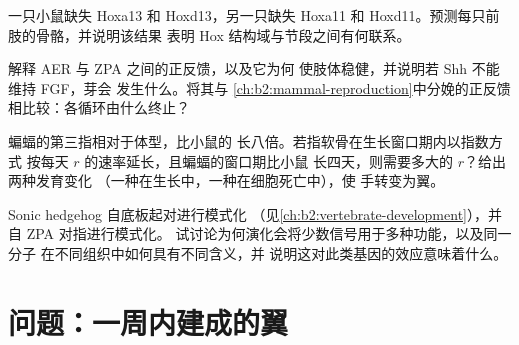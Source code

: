 \begin{exercise}[$\star\star$]\label{exo:b2:limb-organogenesis:9}
一只小鼠缺失 Hoxa13 和 Hoxd13，另一只缺失 Hoxa11 和
Hoxd11。预测每只前肢的骨骼，并说明该结果
表明 Hox 结构域与节段之间有何联系。
\end{exercise}

\begin{exercise}[$\star\star\star$]\label{exo:b2:limb-organogenesis:10}
解释 AER 与 ZPA 之间的正反馈，以及它为何
使肢体稳健，并说明若 Shh 不能维持 FGF，芽会
发生什么。将其与
\cref{ch:b2:mammal-reproduction}中分娩的正反馈相比较：各循环由什么终止？
\end{exercise}

\begin{exercise}[$\star\star\star$]\label{exo:b2:limb-organogenesis:11}
蝙蝠的第三指相对于体型，比小鼠的
长八倍。若指软骨在生长窗口期内以指数方式
按每天 $r$ 的速率延长，且蝙蝠的窗口期比小鼠
长四天，则需要多大的 $r$？给出两种发育变化
（一种在生长中，一种在细胞死亡中），使
手转变为翼。
\end{exercise}

\begin{exercise}[$\star\star\star$]\label{exo:b2:limb-organogenesis:12}
Sonic hedgehog 自底板起对进行模式化
（见\cref{ch:b2:vertebrate-development}），并自 ZPA 对指进行模式化。
试讨论为何演化会将少数信号用于多种功能，以及同一分子
在不同组织中如何具有不同含义，并
说明这对此类基因的效应意味着什么。
\end{exercise}

\section{问题：一周内建成的翼}

